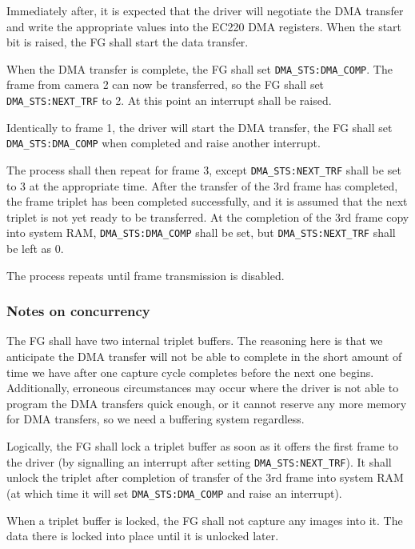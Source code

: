 \documentclass[12pt]{article}
\begin{document}
Immediately after, it is expected that the driver will negotiate the DMA transfer and write the appropriate values into the EC220 DMA registers. When the start bit is raised, the FG shall start the data transfer.

When the DMA transfer is complete, the FG shall set \texttt{DMA\_STS:DMA\_COMP}. The frame from camera 2 can now be transferred, so the FG shall set \texttt{DMA\_STS:NEXT\_TRF} to 2. At this point an interrupt shall be raised.

Identically to frame 1, the driver will start the DMA transfer, the FG shall set \texttt{DMA\_STS:DMA\_COMP} when completed and raise another interrupt.

The process shall then repeat for frame 3, except \texttt{DMA\_STS:NEXT\_TRF} shall be set to 3 at the appropriate time. After the transfer of the 3rd frame has completed, the frame triplet has been completed successfully, and it is assumed that the next triplet is not yet ready to be transferred. At the completion of the 3rd frame copy into system RAM, \texttt{DMA\_STS:DMA\_COMP} shall be set, but \texttt{DMA\_STS:NEXT\_TRF} shall be left as 0.

The process repeats until frame transmission is disabled.

\subsubsection{Notes on concurrency}

The FG shall have two internal triplet buffers. The reasoning here is that we anticipate the DMA transfer will not be able to complete in the short amount of time we have after one capture cycle completes before the next one begins. Additionally, erroneous circumstances may occur where the driver is not able to program the DMA transfers quick enough, or it cannot reserve any more memory for DMA transfers, so we need a buffering system regardless.

Logically, the FG shall lock a triplet buffer as soon as it offers the first frame to the driver (by signalling an interrupt after setting \texttt{DMA\_STS:NEXT\_TRF}). It shall unlock the triplet after completion of transfer of the 3rd frame into system RAM (at which time it will set \texttt{DMA\_STS:DMA\_COMP} and raise an interrupt).

When a triplet buffer is locked, the FG shall not capture any images into it. The data there is locked into place until it is unlocked later.
\end{document}
